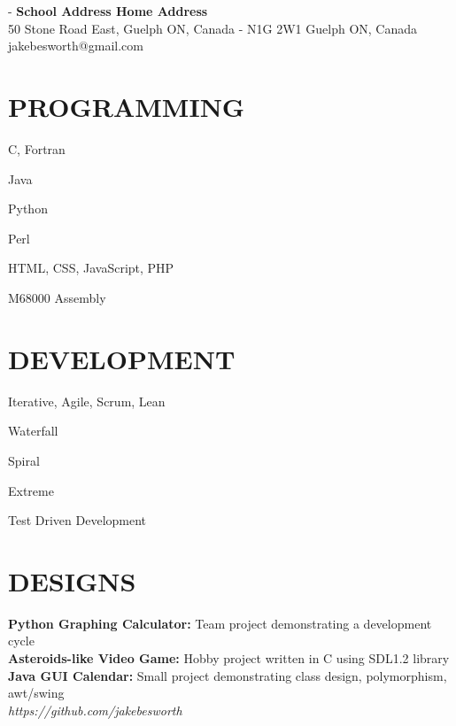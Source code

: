 \documentclass[line, margin]{res}
\begin{document}

\begin{resume}

\section{}
 -\sectionwidth \resumewidth
{\small{\textbf{School Address \hfill Home Address}}\\}
{\color{darkgrey}\small {50 Stone Road East, Guelph ON, Canada -  N1G 2W1} \hfill {Guelph ON, Canada}\\}
{\color{darkgrey}\small{} \hfill {jakebesworth@gmail.com\\}}

\section{PROGRAMMING}
\begin{itemize}
{\color{darkgrey}\item C, Fortran
\item Java
\item Python
\item Perl
\item HTML, CSS, JavaScript, PHP
\item M68000 Assembly\\}
\end{itemize}

\section{DEVELOPMENT}
\begin{itemize}
{\color{darkgrey}\item Iterative, Agile, Scrum, Lean
\item Waterfall
\item Spiral
\item Extreme
\item Test Driven Development}
\end{itemize}

\section{DESIGNS}
{\color{darkgrey}\textbf{Python Graphing Calculator:} Team project demonstrating a development cycle\\ [10pt]
\textbf{Asteroids-like Video Game:} Hobby project written in C using SDL1.2 library\\ [10pt]
\textbf{Java GUI Calendar:} Small project demonstrating class design, polymorphism, awt/swing\\ [10pt]
\textit{https://github.com/jakebesworth\\}}


\end{resume}
\end{document}
